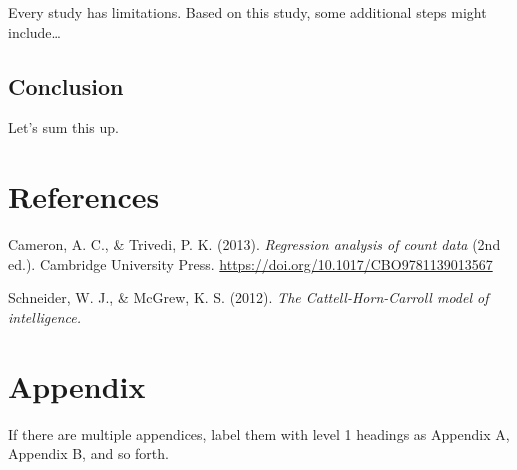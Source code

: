 \documentclass[
  jou,
  longtable,
  colorlinks=true,linkcolor=blue,citecolor=blue,urlcolor=blue]{apa7}
\newlength{\cslhangindent}
\newenvironment{CSLReferences}[2] %
 {\begin{list}{}{%
  \setlength{\itemindent}{0pt}
  \setlength{\leftmargin}{0pt}
  \setlength{\parsep}{0pt}
  \ifodd #1
   \setlength{\leftmargin}{\cslhangindent}
   \setlength{\itemindent}{-1\cslhangindent}
  \fi
  \setlength{\itemsep}{#2\baselineskip}}}
 {\end{list}}
\begin{document}
Every study has limitations. Based on this study, some additional steps
might include\ldots{}

\subsection{Conclusion}\label{conclusion}

Let's sum this up.

\section{References}\label{references}

\label{refs}
\begin{CSLReferences}{1}{0}
Cameron, A. C., \& Trivedi, P. K. (2013). \emph{Regression analysis of
count data} (2nd ed.). Cambridge University Press.
\url{https://doi.org/10.1017/CBO9781139013567}

Schneider, W. J., \& McGrew, K. S. (2012). \emph{The
{Cattell-Horn-Carroll} model of intelligence.}

\end{CSLReferences}

\section{Appendix}\label{appendix}

If there are multiple appendices, label them with level 1 headings as
Appendix A, Appendix B, and so forth.
\end{document}
